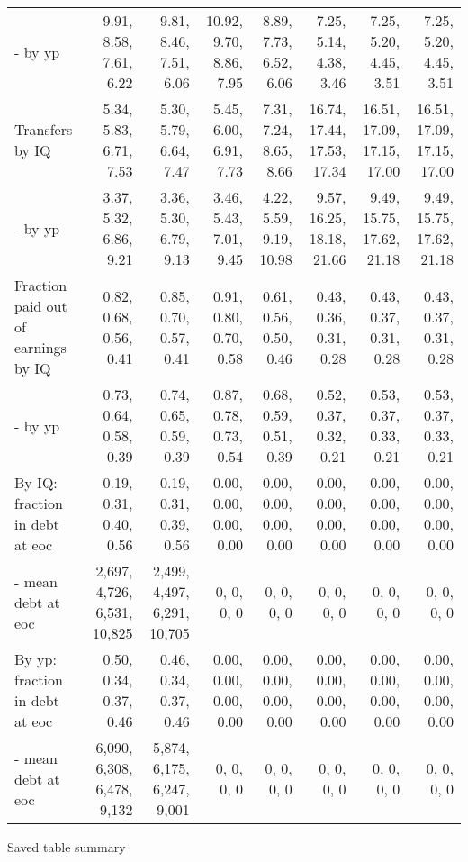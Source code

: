 \begin{tabular}{lrrrrrrr}
- by yp & 9.91, 8.58, 7.61, 6.22  & 9.81, 8.46, 7.51, 6.06  & 10.92, 9.70, 8.86, 7.95  & 8.89, 7.73, 6.52, 6.06  & 7.25, 5.14, 4.38, 3.46  & 7.25, 5.20, 4.45, 3.51  & 7.25, 5.20, 4.45, 3.51  \\ 
Transfers by IQ & 5.34, 5.83, 6.71, 7.53  & 5.30, 5.79, 6.64, 7.47  & 5.45, 6.00, 6.91, 7.73  & 7.31, 7.24, 8.65, 8.66  & 16.74, 17.44, 17.53, 17.34  & 16.51, 17.09, 17.15, 17.00  & 16.51, 17.09, 17.15, 17.00  \\ 
- by yp & 3.37, 5.32, 6.86, 9.21  & 3.36, 5.30, 6.79, 9.13  & 3.46, 5.43, 7.01, 9.45  & 4.22, 5.59, 9.19, 10.98  & 9.57, 16.25, 18.18, 21.66  & 9.49, 15.75, 17.62, 21.18  & 9.49, 15.75, 17.62, 21.18  \\ 
Fraction paid out of earnings by IQ & 0.82, 0.68, 0.56, 0.41  & 0.85, 0.70, 0.57, 0.41  & 0.91, 0.80, 0.70, 0.58  & 0.61, 0.56, 0.50, 0.46  & 0.43, 0.36, 0.31, 0.28  & 0.43, 0.37, 0.31, 0.28  & 0.43, 0.37, 0.31, 0.28  \\ 
- by yp & 0.73, 0.64, 0.58, 0.39  & 0.74, 0.65, 0.59, 0.39  & 0.87, 0.78, 0.73, 0.54  & 0.68, 0.59, 0.51, 0.39  & 0.52, 0.37, 0.32, 0.21  & 0.53, 0.37, 0.33, 0.21  & 0.53, 0.37, 0.33, 0.21  \\ 
By IQ: fraction in debt at eoc & 0.19, 0.31, 0.40, 0.56  & 0.19, 0.31, 0.39, 0.56  & 0.00, 0.00, 0.00, 0.00  & 0.00, 0.00, 0.00, 0.00  & 0.00, 0.00, 0.00, 0.00  & 0.00, 0.00, 0.00, 0.00  & 0.00, 0.00, 0.00, 0.00  \\ 
- mean debt at eoc & 2,697, 4,726, 6,531, 10,825  & 2,499, 4,497, 6,291, 10,705  & 0, 0, 0, 0  & 0, 0, 0, 0  & 0, 0, 0, 0  & 0, 0, 0, 0  & 0, 0, 0, 0  \\ 
By yp: fraction in debt at eoc & 0.50, 0.34, 0.37, 0.46  & 0.46, 0.34, 0.37, 0.46  & 0.00, 0.00, 0.00, 0.00  & 0.00, 0.00, 0.00, 0.00  & 0.00, 0.00, 0.00, 0.00  & 0.00, 0.00, 0.00, 0.00  & 0.00, 0.00, 0.00, 0.00  \\ 
- mean debt at eoc & 6,090, 6,308, 6,478, 9,132  & 5,874, 6,175, 6,247, 9,001  & 0, 0, 0, 0  & 0, 0, 0, 0  & 0, 0, 0, 0  & 0, 0, 0, 0  & 0, 0, 0, 0  \\ 
\hline
\end{tabular}%
Saved table summary

